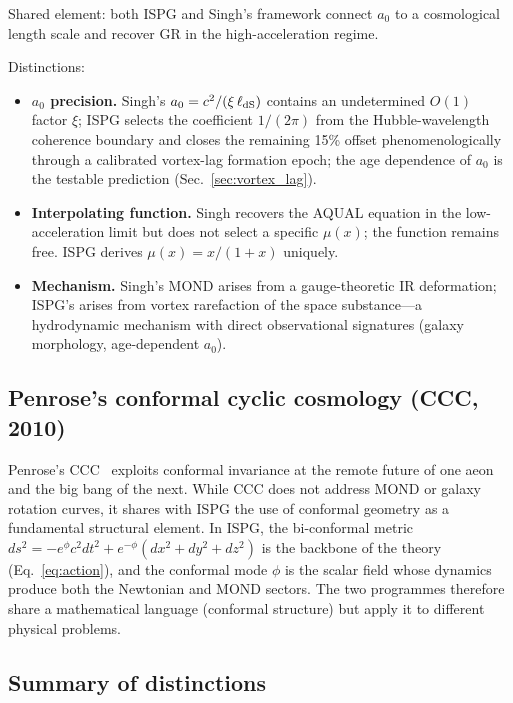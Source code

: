 \documentclass[11pt]{article}
\begin{document}
Shared element: both ISPG and Singh's framework connect $a_0$
to a cosmological length scale and recover GR in the
high-acceleration regime.

Distinctions:
\begin{itemize}
  \item \textbf{$a_0$ precision.}  Singh's $a_0=c^2/(\xi\,\ell_{\rm dS})$
    contains an undetermined $O(1)$ factor $\xi$; ISPG selects the
    coefficient $1/(2\pi)$ from the Hubble-wavelength coherence boundary
    and closes the remaining 15\% offset phenomenologically through a
    calibrated vortex-lag formation epoch; the age dependence of $a_0$ is
    the testable prediction (Sec.~\ref{sec:vortex_lag}).
  \item \textbf{Interpolating function.}  Singh recovers the AQUAL
    equation in the low-acceleration limit but does not select a
    specific $\mu(x)$; the function remains free.  ISPG derives
    $\mu(x)=x/(1+x)$ uniquely.
  \item \textbf{Mechanism.}  Singh's MOND arises from a gauge-theoretic
    IR deformation; ISPG's arises from vortex rarefaction of the
    space substance---a hydrodynamic mechanism with direct
    observational signatures (galaxy morphology, age-dependent
    $a_0$).
\end{itemize}

\subsection{Penrose's conformal cyclic cosmology (CCC, 2010)}

Penrose's CCC~\cite{Penrose2010} exploits conformal invariance at
the remote future of one aeon and the big bang of the next.  While
CCC does not address MOND or galaxy rotation curves, it shares with
ISPG the use of conformal geometry as a fundamental structural
element.  In ISPG, the bi-conformal metric
$ds^2=-e^{\phi}c^2dt^2+e^{-\phi}(dx^2\!+dy^2\!+dz^2)$
is the backbone of the theory
(Eq.~\eqref{eq:action}), and the conformal mode $\phi$ is the
scalar field whose dynamics produce both the Newtonian and MOND
sectors.  The two programmes therefore share a mathematical language
(conformal structure) but apply it to different physical problems.

\subsection{Summary of distinctions}
\end{document}
